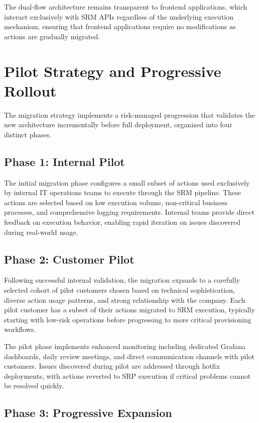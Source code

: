 The dual-flow architecture remains transparent to frontend applications, which interact exclusively with SRM APIs regardless of the underlying execution mechanism, ensuring that frontend applications require no modifications as actions are gradually migrated.

\section{Pilot Strategy and Progressive Rollout}

The migration strategy implements a risk-managed progression that validates the new architecture incrementally before full deployment, organized into four distinct phases.

\subsection{Phase 1: Internal Pilot}

The initial migration phase configures a small subset of actions used exclusively by internal IT operations teams to execute through the SRM pipeline. These actions are selected based on low execution volume, non-critical business processes, and comprehensive logging requirements. Internal teams provide direct feedback on execution behavior, enabling rapid iteration on issues discovered during real-world usage.

\subsection{Phase 2: Customer Pilot}

Following successful internal validation, the migration expands to a carefully selected cohort of pilot customers chosen based on technical sophistication, diverse action usage patterns, and strong relationship with the company. Each pilot customer has a subset of their actions migrated to SRM execution, typically starting with low-risk operations before progressing to more critical provisioning workflows.

The pilot phase implements enhanced monitoring including dedicated Grafana dashboards, daily review meetings, and direct communication channels with pilot customers. Issues discovered during pilot are addressed through hotfix deployments, with actions reverted to SRP execution if critical problems cannot be resolved quickly.

\subsection{Phase 3: Progressive Expansion}

